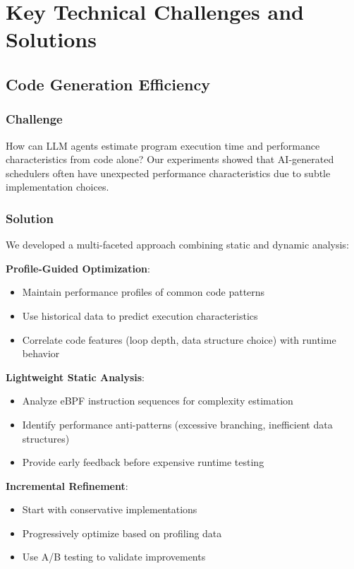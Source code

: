 \section{Key Technical Challenges and Solutions}

\subsection{Code Generation Efficiency}

\subsubsection{Challenge}
How can LLM agents estimate program execution time and performance characteristics from code alone? Our experiments showed that AI-generated schedulers often have unexpected performance characteristics due to subtle implementation choices.

\subsubsection{Solution}
We developed a multi-faceted approach combining static and dynamic analysis:

\textbf{Profile-Guided Optimization}:
\begin{itemize}
\item Maintain performance profiles of common code patterns
\item Use historical data to predict execution characteristics
\item Correlate code features (loop depth, data structure choice) with runtime behavior
\end{itemize}

\textbf{Lightweight Static Analysis}:
\begin{itemize}
\item Analyze eBPF instruction sequences for complexity estimation
\item Identify performance anti-patterns (excessive branching, inefficient data structures)
\item Provide early feedback before expensive runtime testing
\end{itemize}

\textbf{Incremental Refinement}:
\begin{itemize}
\item Start with conservative implementations
\item Progressively optimize based on profiling data
\item Use A/B testing to validate improvements
\end{itemize}

